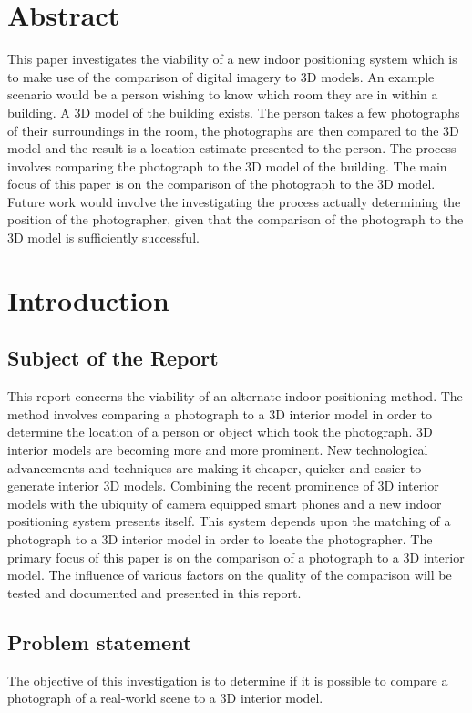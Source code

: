 \documentclass[11pt,a4paper]{report}
\begin{document}
\chapter*{Abstract}
	This paper investigates the viability of a new indoor positioning system which is to make use of the comparison of digital imagery to 3D models. An example scenario would be a person wishing to know which room they are in within a building. A 3D model of the building exists. The person takes a few photographs of their surroundings in the room, the photographs are then compared to the 3D model and the result is a location estimate presented to the person. The process involves comparing the photograph to the 3D model of the building. The main focus of this paper is on the comparison of the photograph to the 3D model. Future work would involve the investigating the process actually determining the position of the photographer, given that the comparison of the photograph to the 3D model is sufficiently successful.

\newpage
\tableofcontents

\newpage
\listoffigures

\newpage
{}
\setcounter{page}{1}
\chapter{Introduction}
	\section{Subject of the Report}
		This report concerns the viability of an alternate indoor positioning method. The method involves comparing a photograph to a 3D interior model in order to determine the location of a person or object which took the photograph. 3D interior models are becoming more and more prominent. New technological advancements and techniques are making it cheaper, quicker and easier to generate interior 3D models. Combining the recent prominence of 3D interior models with the ubiquity of camera equipped smart phones and a new indoor positioning system presents itself. This system depends upon the matching of a photograph to a 3D interior model in order to locate the photographer. The primary focus of this paper is on the comparison of a photograph to a 3D interior model. The influence of various factors on the quality of the comparison will be tested and documented and presented in this report.
	
	\section{Problem statement}
		The objective of this investigation is to determine if it is possible to compare a photograph of a real-world scene to a 3D interior model.
		
\end{document}
